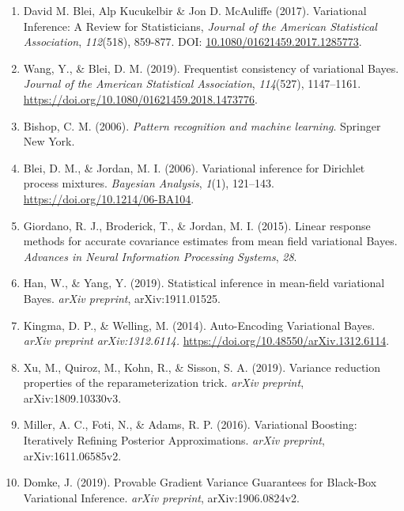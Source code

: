 \documentclass[12pt,a4paper]{article}
\begin{document}
\begin{enumerate}
\item \label{blei2017} David M. Blei, Alp Kucukelbir \& Jon D. McAuliffe (2017). Variational Inference: A Review for Statisticians, \emph{Journal of the American Statistical Association}, \emph{112}(518), 859-877. DOI: \href{https://doi.org/10.1080/01621459.2017.1285773}{10.1080/01621459.2017.1285773}.

\item \label{wang2019} Wang, Y., \& Blei, D. M. (2019). Frequentist consistency of variational Bayes. \emph{Journal of the American Statistical Association}, \emph{114}(527), 1147--1161. \url{https://doi.org/10.1080/01621459.2018.1473776}.

\item \label{bishop2006} Bishop, C. M. (2006). \textit{Pattern recognition and machine learning}. Springer New York.

\item \label{blei2006} Blei, D. M., \& Jordan, M. I. (2006). Variational inference for Dirichlet process mixtures. \emph{Bayesian Analysis}, \emph{1}(1), 121--143. \url{https://doi.org/10.1214/06-BA104}.

\item \label{giordano2015} Giordano, R. J., Broderick, T., \& Jordan, M. I. (2015). Linear response methods for accurate covariance estimates from mean field variational Bayes. \emph{Advances in Neural Information Processing Systems}, \emph{28}.

\item \label{han2019} Han, W., \& Yang, Y. (2019). Statistical inference in mean-field variational Bayes. \emph{arXiv preprint}, arXiv:1911.01525.

\item \label{kingma2013} Kingma, D. P., \& Welling, M. (2014). Auto-Encoding Variational Bayes. \emph{arXiv preprint arXiv:1312.6114.} \url{https://doi.org/10.48550/arXiv.1312.6114}.

\item \label{xu2019} Xu, M., Quiroz, M., Kohn, R., \& Sisson, S. A. (2019). Variance reduction properties of the reparameterization trick. \textit{arXiv preprint}, arXiv:1809.10330v3.

\item \label{miller2016} Miller, A. C., Foti, N., \& Adams, R. P. (2016). Variational Boosting: Iteratively Refining Posterior Approximations. \textit{arXiv preprint}, arXiv:1611.06585v2.

\item \label{domke2019} Domke, J. (2019). Provable Gradient Variance Guarantees for Black-Box Variational Inference. \textit{arXiv preprint}, arXiv:1906.0824v2.


\end{enumerate}
\end{document}
